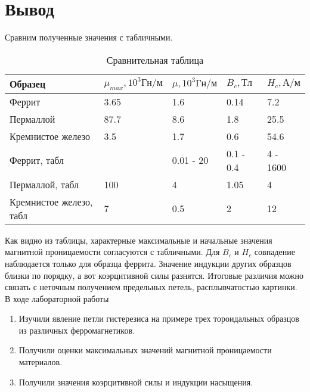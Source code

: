 \documentclass[12pt,a4paper]{article}
\begin{document}
\section{Вывод}

Сравним полученные значения с табличными.

\begin{table}[H]
    \centering
    \begin{center}
    \end{center}
    \vspace{0.1cm}
    \label{tab:my_label}
    \begin{tabular}{|p{4cm}|p{2.5cm}|p{2cm}|p{2cm}|p{2cm}|}
 \hline
 Образец & $\mu_{max}, 10^3Гн/м$ & $\mu, 10^3Гн/м$ & $B_c, Тл$ & $H_c, А/м$ \\
 \hline
    Феррит & 3.65 & 1.6 & 0.14 & 7.2\\
 \hline
    Пермаллой & 87.7 & 8.6 & 1.8& 25.5\\
   \hline
    Кремнистое железо & 3.5  & 1.7 & 0.6 & 54.6\\
    \hline
    Феррит, табл &  & 0.01 - 20 & 0.1 - 0.4 & 4 - 1600\\
 \hline
    Пермаллой, табл & 100 & 4 & 1.05 & 4\\
   \hline
    Кремнистое железо, табл & 7 & 0.5 & 2 & 12\\
\hline
\end{tabular}
\caption{Сравнительная таблица}
\end{table}

Как видно из таблицы, характерные максимальные и начальные значения магнитной проницаемости согласуются с табличными. Для $B_c$ и $H_c$ совпадение наблюдается только для образца феррита. Значение  индукции других образцов близки по порядку, а вот коэрцитивной силы разнятся. Итоговые различия можно связать с неточным получением предельных петель, расплывчатостью картинки.\\ 

В ходе лабораторной работы
\begin{enumerate}
    \item Изучили явление петли гистерезиса на примере трех тороидальных образцов из различных ферромагнетиков.
    \item Получили оценки максимальных значений магнитной проницаемости материалов.
    \item Получили значения коэрцитивной силы и индукции насыщения.
\end{enumerate}


\newpage
\end{document}
